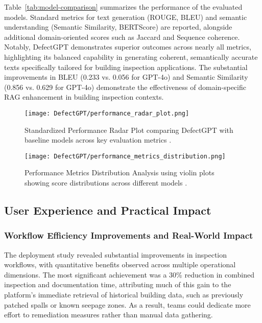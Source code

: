 Table~\ref{tab:model-comparison} summarizes the performance of the evaluated models. Standard metrics for text generation (ROUGE, BLEU) and semantic understanding (Semantic Similarity, BERTScore) are reported, alongside additional domain-oriented scores such as Jaccard and Sequence coherence. Notably, DefectGPT demonstrates superior outcomes across nearly all metrics, highlighting its balanced capability in generating coherent, semantically accurate texts specifically tailored for building inspection applications. The substantial improvements in BLEU (0.233 vs. 0.056 for GPT-4o) and Semantic Similarity (0.856 vs. 0.629 for GPT-4o) demonstrate the effectiveness of domain-specific RAG enhancement in building inspection contexts.

\begin{figure}[htbp]
    \centering
    \begin{minipage}{0.48\textwidth}
        \centering
        \texttt{[image: DefectGPT/performance\_radar\_plot.png]}
        \caption{Standardized Performance Radar Plot comparing DefectGPT with baseline models across key evaluation metrics \cite{zhang2024automated}.}
        \label{fig:radar-plot}
    \end{minipage}
    \hfill
    \begin{minipage}{0.48\textwidth}
        \centering
        \texttt{[image: DefectGPT/performance\_metrics\_distribution.png]}
        \caption{Performance Metrics Distribution Analysis using violin plots showing score distributions across different models \cite{zhang2024automated}.}
        \label{fig:performance-distribution}
    \end{minipage}
\end{figure}

\subsection{User Experience and Practical Impact}

\subsubsection{Workflow Efficiency Improvements and Real-World Impact}

The deployment study revealed substantial improvements in inspection workflows, with quantitative benefits observed across multiple operational dimensions. The most significant achievement was a 30\% reduction in combined inspection and documentation time, attributing much of this gain to the platform's immediate retrieval of historical building data, such as previously patched spalls or known seepage zones. As a result, teams could dedicate more effort to remediation measures rather than manual data gathering.

